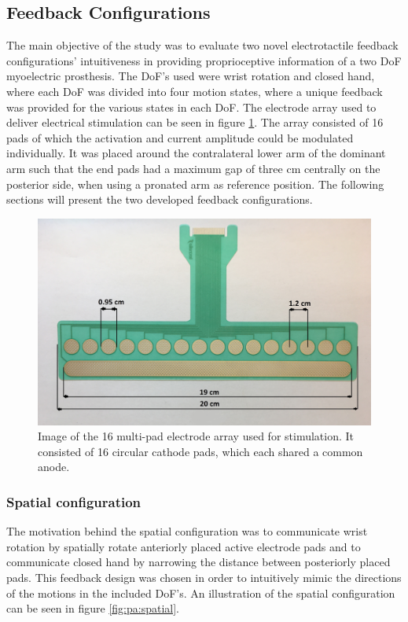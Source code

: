 \subsection{Feedback Configurations}
The main objective of the study was to evaluate two novel electrotactile feedback configurations' intuitiveness in providing proprioceptive information of a two DoF myoelectric prosthesis. The DoF's used were wrist rotation and closed hand, where each DoF was divided into four motion states, where a unique feedback was provided for the various states in each DoF. The electrode array used to deliver electrical stimulation can be seen in figure \ref{fig:pa:electrode}. The array consisted of 16 pads of which the activation and current amplitude could be modulated individually. It was placed around the contralateral lower arm of the dominant arm such that the end pads had a maximum gap of three cm centrally on the posterior side, when using a pronated arm as reference position. The following sections will present the two developed feedback configurations. 

\begin{figure}[H]                 
	\includegraphics[width=.95\textwidth]{figures/electrode}  
	\caption{Image of the 16 multi-pad electrode array used for stimulation. It consisted of 16 circular cathode pads, which each shared a common anode.}
	\label{fig:pa:electrode} 
\end{figure}

\subsubsection{Spatial configuration}
The motivation behind the spatial configuration was to communicate wrist rotation by spatially rotate anteriorly placed active electrode pads and to communicate closed hand by narrowing the distance between posteriorly placed pads. This feedback design was chosen in order to intuitively mimic the directions of the motions in the included DoF's. An illustration of the spatial configuration can be seen in figure \ref{fig:pa:spatial}. 


